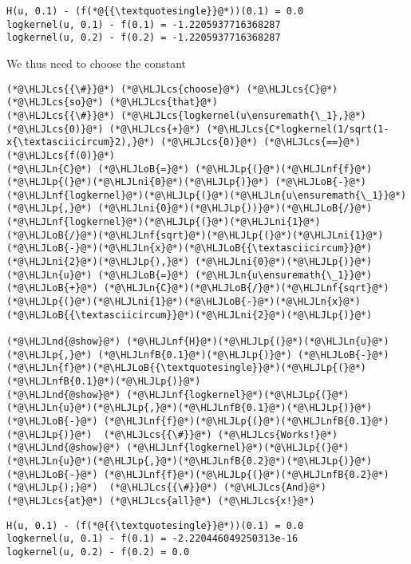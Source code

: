 \documentclass[12pt,landscape]{article}
\newcommand{\HLJLn}[1]{#1}
\newcommand{\HLJLnd}[1]{\textcolor[RGB]{214,102,97}{#1}}
\newcommand{\HLJLnf}[1]{\textcolor[RGB]{66,102,213}{#1}}
\newcommand{\HLJLnfB}[1]{\textcolor[RGB]{59,151,46}{#1}}
\newcommand{\HLJLni}[1]{\textcolor[RGB]{59,151,46}{#1}}
\newcommand{\HLJLoB}[1]{\textcolor[RGB]{102,102,102}{\textbf{#1}}}
\newcommand{\HLJLp}[1]{#1}
\newcommand{\HLJLcs}[1]{\textcolor[RGB]{153,153,119}{\textit{#1}}}
\begin{document}
{\begin{lstlisting}
H(u, 0.1) - (f(*@{{\textquotesingle}}@*))(0.1) = 0.0
logkernel(u, 0.1) - f(0.1) = -1.2205937716368287
logkernel(u, 0.2) - f(0.2) = -1.2205937716368287
\end{lstlisting}


We thus need to choose the constant


\begin{lstlisting}
(*@\HLJLcs{{\#}}@*) (*@\HLJLcs{choose}@*) (*@\HLJLcs{C}@*) (*@\HLJLcs{so}@*) (*@\HLJLcs{that}@*)
(*@\HLJLcs{{\#}}@*) (*@\HLJLcs{logkernel(u\ensuremath{\_1},}@*) (*@\HLJLcs{0)}@*) (*@\HLJLcs{+}@*) (*@\HLJLcs{C*logkernel(1/sqrt(1-x{\textasciicircum}2),}@*) (*@\HLJLcs{0)}@*) (*@\HLJLcs{==}@*) (*@\HLJLcs{f(0)}@*)
(*@\HLJLn{C}@*) (*@\HLJLoB{=}@*) (*@\HLJLp{(}@*)(*@\HLJLnf{f}@*)(*@\HLJLp{(}@*)(*@\HLJLni{0}@*)(*@\HLJLp{)}@*) (*@\HLJLoB{-}@*) (*@\HLJLnf{logkernel}@*)(*@\HLJLp{(}@*)(*@\HLJLn{u\ensuremath{\_1}}@*)(*@\HLJLp{,}@*) (*@\HLJLni{0}@*)(*@\HLJLp{))}@*)(*@\HLJLoB{/}@*)(*@\HLJLnf{logkernel}@*)(*@\HLJLp{(}@*)(*@\HLJLni{1}@*)(*@\HLJLoB{/}@*)(*@\HLJLnf{sqrt}@*)(*@\HLJLp{(}@*)(*@\HLJLni{1}@*)(*@\HLJLoB{-}@*)(*@\HLJLn{x}@*)(*@\HLJLoB{{\textasciicircum}}@*)(*@\HLJLni{2}@*)(*@\HLJLp{),}@*) (*@\HLJLni{0}@*)(*@\HLJLp{)}@*)
(*@\HLJLn{u}@*) (*@\HLJLoB{=}@*) (*@\HLJLn{u\ensuremath{\_1}}@*) (*@\HLJLoB{+}@*) (*@\HLJLn{C}@*)(*@\HLJLoB{/}@*)(*@\HLJLnf{sqrt}@*)(*@\HLJLp{(}@*)(*@\HLJLni{1}@*)(*@\HLJLoB{-}@*)(*@\HLJLn{x}@*)(*@\HLJLoB{{\textasciicircum}}@*)(*@\HLJLni{2}@*)(*@\HLJLp{)}@*)

(*@\HLJLnd{@show}@*) (*@\HLJLnf{H}@*)(*@\HLJLp{(}@*)(*@\HLJLn{u}@*)(*@\HLJLp{,}@*) (*@\HLJLnfB{0.1}@*)(*@\HLJLp{)}@*) (*@\HLJLoB{-}@*) (*@\HLJLn{f}@*)(*@\HLJLoB{{\textquotesingle}}@*)(*@\HLJLp{(}@*)(*@\HLJLnfB{0.1}@*)(*@\HLJLp{)}@*)
(*@\HLJLnd{@show}@*) (*@\HLJLnf{logkernel}@*)(*@\HLJLp{(}@*)(*@\HLJLn{u}@*)(*@\HLJLp{,}@*)(*@\HLJLnfB{0.1}@*)(*@\HLJLp{)}@*) (*@\HLJLoB{-}@*) (*@\HLJLnf{f}@*)(*@\HLJLp{(}@*)(*@\HLJLnfB{0.1}@*)(*@\HLJLp{)}@*)  (*@\HLJLcs{{\#}}@*) (*@\HLJLcs{Works!}@*)
(*@\HLJLnd{@show}@*) (*@\HLJLnf{logkernel}@*)(*@\HLJLp{(}@*)(*@\HLJLn{u}@*)(*@\HLJLp{,}@*)(*@\HLJLnfB{0.2}@*)(*@\HLJLp{)}@*) (*@\HLJLoB{-}@*) (*@\HLJLnf{f}@*)(*@\HLJLp{(}@*)(*@\HLJLnfB{0.2}@*)(*@\HLJLp{);}@*)  (*@\HLJLcs{{\#}}@*) (*@\HLJLcs{And}@*) (*@\HLJLcs{at}@*) (*@\HLJLcs{all}@*) (*@\HLJLcs{x!}@*)
\end{lstlisting}

\begin{lstlisting}
H(u, 0.1) - (f(*@{{\textquotesingle}}@*))(0.1) = 0.0
logkernel(u, 0.1) - f(0.1) = -2.220446049250313e-16
logkernel(u, 0.2) - f(0.2) = 0.0
\end{lstlisting}
\newpage

}
\end{document}
